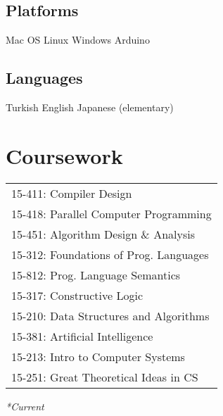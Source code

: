 \documentclass[letterpaper]{deedy-resume} %
\begin{document}
\begin{minipage}[t]{0.33\textwidth}
\sectionspace %


\subsection{Platforms}

Mac OS \textbullet{} Linux \textbullet{} Windows \textbullet{} Arduino

\sectionspace %


\subsection{Languages}

Turkish \textbullet{} English \textbullet{} Japanese (elementary)

\sectionspace %


\section{Coursework}

\begingroup
\renewcommand*{\arraystretch}{1.05}
\begin{tabular}{@{}l@{}}
15-411: Compiler Design \\
15-418: Parallel Computer Programming \\
15-451: Algorithm Design \& Analysis \\
15-312: Foundations of Prog. Languages \\
15-812: Prog. Language Semantics \\
15-317: Constructive Logic \\
15-210: Data Structures and Algorithms \\
15-381: Artificial Intelligence \\
15-213: Intro to Computer Systems \\
15-251: Great Theoretical Ideas in CS
\end{tabular}
\endgroup

\null\hfill {\footnotesize \textit{*Current}}


\end{minipage}
\end{document}
